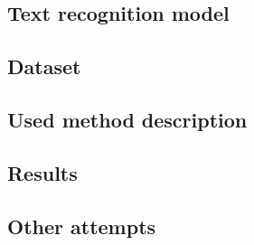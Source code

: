 \subsection{Text recognition model}
\label{subsec:ch3sec2subsec4subsubsec2}

\subsection{Dataset}
\label{subsec:ch3sec2subsec4subsubsec3}

\subsection{Used method description}
\label{subsec:ch3sec2subsec4subsubsec4}

\subsection{Results}
\label{subsec:ch3sec2subsec4subsubsec5}

\subsection{Other attempts}
\label{subsec:ch3sec2subsec4subsubsec6}


